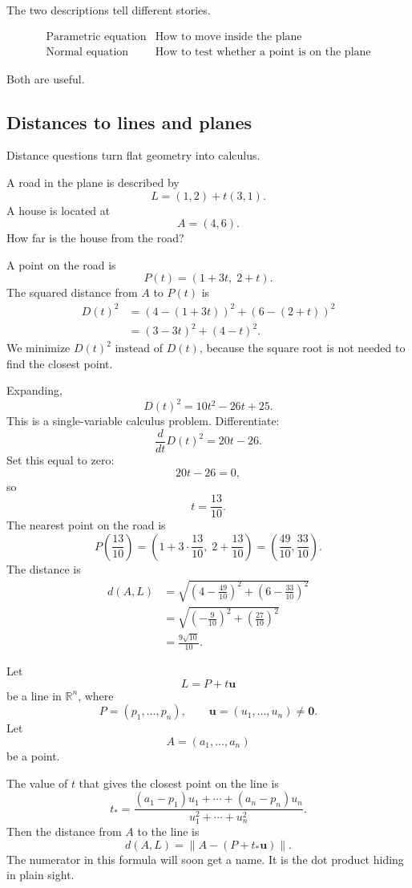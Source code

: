 The two descriptions tell different stories.

\[
\begin{array}{c|c}
\text{Parametric equation} & \text{How to move inside the plane} \\
\text{Normal equation} & \text{How to test whether a point is on the plane}
\end{array}
\]

Both are useful.

\subsection{Distances to lines and planes}

Distance questions turn flat geometry into calculus.

A road in the plane is described by
\[
    L=(1,2)+t(3,1).
\]
A house is located at
\[
    A=(4,6).
\]
How far is the house from the road?

A point on the road is
\[
    P(t)=(1+3t,\;2+t).
\]
The squared distance from \(A\) to \(P(t)\) is
\[
\begin{aligned}
    D(t)^2
    &=
    (4-(1+3t))^2+(6-(2+t))^2  \\
    &=
    (3-3t)^2+(4-t)^2.
\end{aligned}
\]
We minimize \(D(t)^2\) instead of \(D(t)\), because the square root is not needed to
find the closest point.

Expanding,
\[
    D(t)^2=10t^2-26t+25.
\]
This is a single-variable calculus problem.  Differentiate:
\[
    \frac{d}{dt}D(t)^2=20t-26.
\]
Set this equal to zero:
\[
    20t-26=0,
\]
so
\[
    t=\frac{13}{10}.
\]
The nearest point on the road is
\[
    P\left(\frac{13}{10}\right)
    =
    \left(1+3\cdot\frac{13}{10},\;2+\frac{13}{10}\right)
    =
    \left(\frac{49}{10},\frac{33}{10}\right).
\]
The distance is
\[
\begin{aligned}
    d(A,L)
    &=
    \sqrt{\left(4-\frac{49}{10}\right)^2+
          \left(6-\frac{33}{10}\right)^2}  \\
    &=
    \sqrt{\left(-\frac{9}{10}\right)^2+
          \left(\frac{27}{10}\right)^2} \\
    &=
    \frac{9\sqrt{10}}{10}.
\end{aligned}
\]

\begin{example}
Let
\[
    L=P+t\mathbf u
\]
be a line in \(\mathbb R^n\), where
\[
    P=(p_1,\ldots,p_n),\qquad
    \mathbf u=(u_1,\ldots,u_n)\neq \mathbf 0.
\]
Let
\[
    A=(a_1,\ldots,a_n)
\]
be a point.

The value of \(t\) that gives the closest point on the line is
\[
    t_*
    =
    \frac{(a_1-p_1)u_1+\cdots+(a_n-p_n)u_n}
         {u_1^2+\cdots+u_n^2}.
\]
Then the distance from \(A\) to the line is
\[
    d(A,L)=\|A-(P+t_*\mathbf u)\|.
\]
The numerator in this formula will soon get a name.  It is the dot product hiding in
plain sight.
\end{example}

